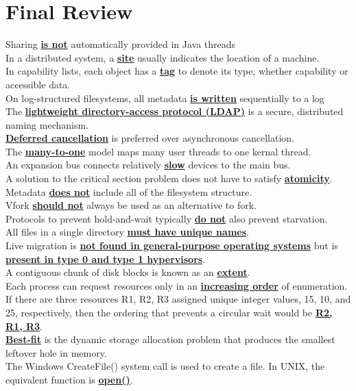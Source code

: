 \documentclass[10pt]{article}
\newcommand{\qw}[1]{\textbf{\ul{#1}}}
\begin{document}
\section*{\centering Final Review}
Sharing \qw{is not} automatically provided in Java threads\\[2mm]
In a distributed system, a \qw{site} usually indicates the location of a machine.\\[2mm]
In capability lists, each object has a \qw{tag} to denote its type, whether capability or accessible data.\\[2mm]
On log-structured filesystems, all metadata \qw{is written} sequentially to a log\\[2mm]
The \qw{lightweight directory-access protocol (LDAP)} is a secure, distributed naming mechanism.\\[2mm]
\qw{Deferred cancellation} is preferred over asynchronous cancellation.\\[2mm]
The \qw{many-to-one} model maps many user threads to one kernal thread.\\[2mm]
An expansion bus connects relatively \qw{slow} devices to the main bus.\\[2mm]
A solution to the critical section problem does not have to satisfy \qw{atomicity}.\\[2mm]
Metadata \qw{does not} include all of the filesystem structure.\\[2mm]
Vfork \qw{should not} always be used as an alternative to fork.\\[2mm]
Protocols to prevent hold-and-wait typically \qw{do not} also prevent starvation.\\[2mm]
All files in a single directory \qw{must have unique names}.\\[2mm]
Live migration is \qw{not found in general-purpose operating systems} but is \qw{present in type 0 and type 1 hypervisors}.\\[2mm]
A contiguous chunk of disk blocks is known as an \qw{extent}.\\[2mm]
Each process can request resources only in an \qw{increasing order} of enumeration. If there are three resources R1, R2, R3 assigned unique integer values, 15, 10, and 25, respectively, then the ordering that prevents a circular wait would be \qw{R2, R1, R3}.\\[2mm]
\qw{Best-fit} is the dynamic storage allocation problem that produces the smallest leftover hole in memory.\\[2mm]
The Windows CreateFile() system call is used to create a file. In UNIX, the equivalent function is \qw{open()}.\\[2mm]
\end{document}
